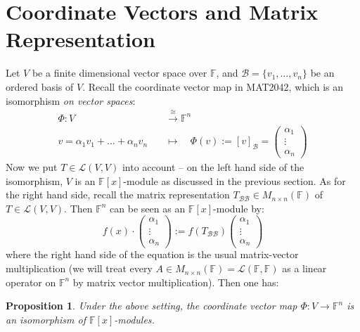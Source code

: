 \documentclass[11pt,openany]{book}
\theoremstyle{plain}
\newtheorem{proposition}[proposition]{Proposition}
\theoremstyle{definition}
\theoremstyle{remark}
\begin{document}
\section{Coordinate Vectors and Matrix Representation}   
   Let $V$ be a finite dimensional vector space over $\mathbb{F}$, and $\mathcal{B} = \{v_1, \dots, v_n\}$ be an ordered basis of $V$. Recall the coordinate vector map in MAT2042, which is an isomorphism {\it on vector spaces}:
    \begin{align*}\Phi: V &\xrightarrow{\cong} \mathbb{F}^n \\
    v = \alpha_1 v_1 + \dots + \alpha_n v_n \quad &\mapsto \quad \Phi(v) := [v]_{\mathcal{B}} = \begin{pmatrix}
        \alpha_1 \\ \vdots \\ \alpha_n
    \end{pmatrix} \end{align*}
    Now we put $T \in \mathcal{L}(V,V)$ into account -- on the left hand side of the isomorphism, $V$ is an $\mathbb{F}[x]$-module as discussed in the previous section. As for the right hand side, recall the matrix representation $T_{\mathcal{B}\mathcal{B}} \in M_{n \times n}(\mathbb{F})$ of $T \in \mathcal{L}(V,V)$. Then $\mathbb{F}^n$ can be seen as an $\mathbb{F}[x]$-module by:
        $$f(x) \cdot \begin{pmatrix} \alpha_1 \\ \vdots \\ \alpha_n \end{pmatrix} := f(T_{\mathcal{B}\mathcal{B}})\begin{pmatrix} \alpha_1 \\ \vdots \\ \alpha_n \end{pmatrix}$$
    where the right hand side of the equation is the usual matrix-vector multiplication (we will treat every $A \in M_{n \times n}(\mathbb{F}) = \mathcal{L}(\mathbb{F},\mathbb{F})$ as a linear operator on $\mathbb{F}^n$ by matrix vector multiplication). Then one has:
\begin{proposition}
    Under the above setting, the coordinate vector map $\Phi: V \longrightarrow \mathbb{F}^n$ is an isomorphism of $\mathbb{F}[x]$-modules.
\end{proposition}
\end{document}
